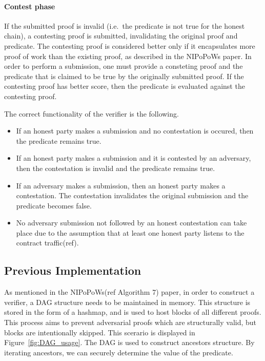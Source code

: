 \paragraph{Contest phase} If the submitted proof is invalid (i.e.\ the
predicate is not true for the honest chain), a contesting proof is
submitted, invalidating the original proof and predicate. The
contesting proof is considered better only if it encapsulates more
proof of work than the existing proof, as described in the NIPoPoWs
paper. In order to perform a submission, one must provide a consteting
proof and the predicate that is claimed to be true by the originally
submitted proof. If the contesting proof has better score, then the
predicate is evaluated against the contesting proof.

The correct functionality of the verifier is the following.
\begin{itemize}
    \item
        If an honest party makes a submission and no contestation is
        occured, then the predicate remains true.
    \item
        If an honest party makes a submission and it is contested by an
        adversary, then the contestation is invalid and the predicate
        remains true.
    \item
        If an adversary makes a submission, then an honest party makes a
        contestation. The contestation invalidates the original submission
        and the predicate becomes false.
    \item
        No adversary submission not followed by an honest contestation can
        take place due to the assumption that at least one honest party
        listens to the contract traffic(ref).
\end{itemize}

\subsection{Previous Implementation}
As mentioned in the NIPoPoWs(ref Algorithm 7) paper, in order to construct a
verifier, a DAG structure needs to be maintained in memory. This structure is
stored in the form of a hashmap, and is used to host blocks of all different
proofs. This process aims to prevent adversarial proofs which are structurally
valid, but blocks are intentionally skipped. This scerario is displayed in
Figure~\ref{fig:DAG_usage}. The DAG is used to construct ancestors structure. By iterating ancestors, we
can securely determine the value of the predicate.

